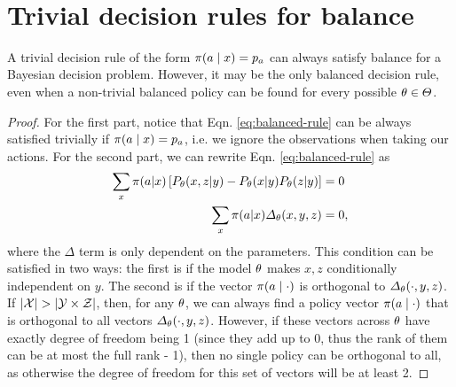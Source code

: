 ~\\

\section{Trivial decision rules for balance}
\label{sec:counterexample}
 
\begin{theorem}
  A trivial decision rule of the form $\pi(a \mid x) = p_a$ can always satisfy balance for a Bayesian decision problem. However, it may be the only balanced decision rule, even when a non-trivial balanced policy can be found for every possible $\theta \in \Theta$.
  \label{lem:trivial-balance}
\end{theorem}
\begin{proof}
  For the first part, notice that Eqn. \eqref{eq:balanced-rule}
  can be always satisfied trivially if $\pi(a \mid x) = p_a$, i.e. we ignore the observations when taking our actions.
  For the second part, we can rewrite Eqn. \eqref{eq:balanced-rule} as
  \begin{align*}
    \sum_x \pi(a | x) \left[P_\theta(x, z | y) - P_\theta(x | y) P_\theta(z | y) \right] &= 0\\
    \sum_x \pi(a | x) \Delta_\theta(x, y, z) &= 0,
  \end{align*}
  where the $\Delta$ term is only dependent on the parameters.  This
  condition can be satisfied in two ways: the first is if the model
  $\theta$ makes $x, z$ conditionally independent on $y$. The second
  is if the vector $\pi(a \mid \cdot)$ is orthogonal to
  $\Delta_\theta(\cdot, y, z)$. If $|\mathcal{X}| > |\mathcal{Y} \times \mathcal{Z}|$, then,
  for any $\theta$, we can always find a policy vector
  $\pi(a \mid \cdot)$ that is orthogonal to all vectors
  $\Delta_\theta(\cdot, y, z)$. However, if these vectors across $\theta$ have exactly degree of freedom being 1 (since they add up to 0, thus the rank of them can be at most the full rank - 1), then no single policy can be orthogonal
  to all, as otherwise the degree of freedom for this set of vectors will be at least 2. 
\end{proof}


